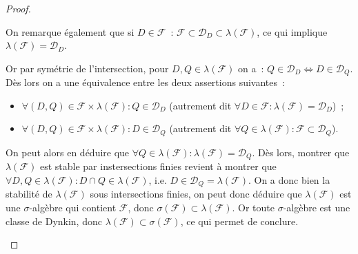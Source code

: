 \documentclass{article}
\theoremstyle{definition}
\begin{document}
\begin{proof}
\begin{enumerate}
	On remarque également que si $D \in \mathcal F$~: $\mathcal F \subset \mathcal D_D \subset \lambda(\mathcal F)$, ce qui implique $\lambda(\mathcal F) = \mathcal D_D$.

	Or par symétrie de l'intersection, pour $D, Q \in \lambda(\mathcal F)$ on a~: $Q \in \mathcal D_D \iff D \in \mathcal D_Q$. Dès lors on a une équivalence entre les deux
	assertions suivantes~:
	\begin{itemize}
		\item $\forall (D, Q) \in \mathcal F \times \lambda(\mathcal F) : Q \in \mathcal D_D$ (autrement dit $\forall D \in \mathcal F : \lambda(\mathcal F) = \mathcal D_D$)~;
		\item $\forall (D, Q) \in \mathcal F \times \lambda(\mathcal F) : D \in \mathcal D_Q$ (autrement dit $\forall Q \in \lambda(\mathcal F) : \mathcal F \subset \mathcal D_Q$).
	\end{itemize}

	On peut alors en déduire que $\forall Q \in \lambda(\mathcal F) : \lambda(\mathcal F) = \mathcal D_Q$. Dès lors, montrer que $\lambda(\mathcal F)$ est stable par
	instersections finies revient à montrer que $\forall D, Q \in \lambda(\mathcal F) : D \cap Q \in \lambda(\mathcal F)$, i.e. $D \in \mathcal D_Q = \lambda(\mathcal F)$.
	On a donc bien la stabilité de $\lambda(\mathcal F)$ sous intersections finies, on peut donc déduire que $\lambda(\mathcal F)$ est une $\sigma$-algèbre qui contient $\mathcal F$,
	donc $\sigma(\mathcal F) \subset \lambda(\mathcal F)$. Or toute $\sigma$-algèbre est une classe de Dynkin, donc $\lambda(\mathcal F) \subset \sigma(\mathcal F)$, ce qui permet
	de conclure.
\end{enumerate}
\end{proof}
\end{document}

